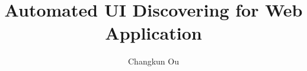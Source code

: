 \documentclass[11pt,a4paper,twoside]{article}
\title{Automated UI Discovering for Web Application}
\author{Changkun Ou}
\begin{document}
\makecover
\makeaufgabenstellung
\makededication
\makeabstract
\maketoc













\end{document}
